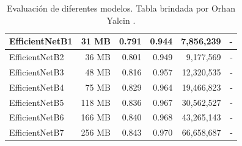 \begin{table}[h!]
\begin{tabular}{|l|r|r|r|r|r|}
    EfficientNetB1                                               & 31 MB                              & 0.791                                                                                   & 0.944                                                                                   & 7,856,239                                & -                                   \\ \hline
    EfficientNetB2                                               & 36 MB                              & 0.801                                                                                   & 0.949                                                                                   & 9,177,569                                & -                                   \\ \hline
    EfficientNetB3                                               & 48 MB                              & 0.816                                                                                   & 0.957                                                                                   & 12,320,535                               & -                                   \\ \hline
    EfficientNetB4                                               & 75 MB                              & 0.829                                                                                   & 0.964                                                                                   & 19,466,823                               & -                                   \\ \hline
    EfficientNetB5                                               & 118 MB                             & 0.836                                                                                   & 0.967                                                                                   & 30,562,527                               & -                                   \\ \hline
    EfficientNetB6                                               & 166 MB                             & 0.840                                                                                   & 0.968                                                                                   & 43,265,143                               & -                                   \\ \hline
    EfficientNetB7                                               & 256 MB                             & 0.843                                                                                   & 0.970                                                                                   & 66,658,687                               & -                                   \\ \hline
    \end{tabular}
    \caption{Evaluación de diferentes modelos. Tabla brindada por Orhan Yalcin \protect\cite{DataModelos}. }
    \label{evaluación}
\end{table}

